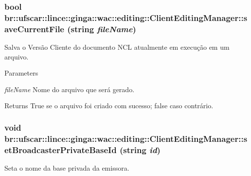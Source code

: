 \hypertarget{classbr_1_1ufscar_1_1lince_1_1ginga_1_1wac_1_1editing_1_1ClientEditingManager_a968a7252444aa05bb471f47e4c554d19}{
\subsubsection[{saveCurrentFile}]{\setlength{\rightskip}{0pt plus 5cm}bool br::ufscar::lince::ginga::wac::editing::ClientEditingManager::saveCurrentFile (string {\em fileName})}}
\label{classbr_1_1ufscar_1_1lince_1_1ginga_1_1wac_1_1editing_1_1ClientEditingManager_a968a7252444aa05bb471f47e4c554d19}


Salva o Versão Cliente do documento NCL atualmente em execução em um arquivo. 


\begin{DoxyParams}{Parameters}
\item[{\em fileName}]Nome do arquivo que será gerado. \end{DoxyParams}
\begin{DoxyReturn}{Returns}
True se o arquivo foi criado com sucesso; false caso contrário. 
\end{DoxyReturn}
\hypertarget{classbr_1_1ufscar_1_1lince_1_1ginga_1_1wac_1_1editing_1_1ClientEditingManager_ae80834b5a0aa0ffdfb399a85f92b9bd5}{
\subsubsection[{setBroadcasterPrivateBaseId}]{\setlength{\rightskip}{0pt plus 5cm}void br::ufscar::lince::ginga::wac::editing::ClientEditingManager::setBroadcasterPrivateBaseId (string {\em id})}}
\label{classbr_1_1ufscar_1_1lince_1_1ginga_1_1wac_1_1editing_1_1ClientEditingManager_ae80834b5a0aa0ffdfb399a85f92b9bd5}


Seta o nome da base privada da emissora. 


